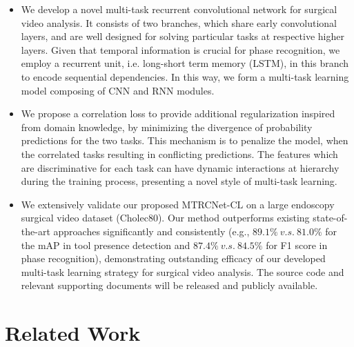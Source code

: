 \documentclass{elsarticle}
\begin{document}
\begin{itemize}
	\item
	We develop a novel multi-task recurrent convolutional network for surgical video analysis. It consists of two branches, which share early convolutional layers, and are well designed for solving particular tasks at respective higher layers.
	Given that temporal information is crucial for phase recognition, we employ a recurrent unit, i.e. long-short term memory (LSTM), in this branch to encode sequential dependencies. In this way, we form a multi-task learning model composing of CNN and RNN modules.
	
	\item 
	We propose a correlation loss to provide additional regularization inspired from domain knowledge, by minimizing the divergence of probability predictions for the two tasks.
	This mechanism is to penalize the model, when the correlated tasks resulting in conflicting predictions.
	The features which are discriminative for each task can have dynamic interactions at hierarchy during the training process, presenting a novel style of multi-task learning.
	
	\item 
	We extensively validate our proposed MTRCNet-CL on a large endoscopy surgical video dataset (Cholec80). Our method outperforms existing state-of-the-art approaches significantly and consistently (e.g., $89.1\% ~v.s.~ 81.0\%$ for the mAP in tool presence detection and $87.4\%~v.s.~84.5\%$ for F1 score in phase recognition), demonstrating outstanding efficacy of our developed multi-task learning strategy for surgical video analysis. The source code and relevant supporting documents will be released and publicly available.
	
\end{itemize}





\section{Related Work}
\end{document}
